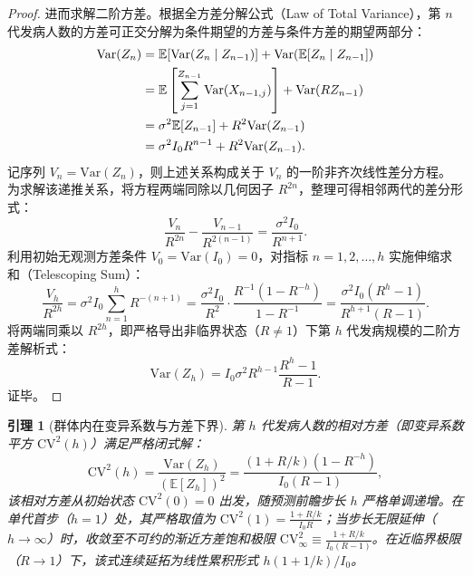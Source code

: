 \documentclass[11pt,a4paper]{article}
\theoremstyle{plain}
\newtheorem{lemma}{引理}
\theoremstyle{definition}
\begin{document}
\begin{proof}
进而求解二阶方差。根据全方差分解公式（Law of Total Variance），第 $n$ 代发病人数的方差可正交分解为条件期望的方差与条件方差的期望两部分：
\begin{align}
\text{Var}(Z_n) &= \mathbb{E}[\text{Var}(Z_n \mid Z_{n-1})] + \text{Var}(\mathbb{E}[Z_n \mid Z_{n-1}]) \notag \\
&= \mathbb{E}\left[\sum_{j=1}^{Z_{n-1}} \text{Var}(X_{n-1, j})\right] + \text{Var}(R Z_{n-1}) \notag \\
&= \sigma^2 \mathbb{E}[Z_{n-1}] + R^2 \text{Var}(Z_{n-1}) \notag \\
&= \sigma^2 I_0 R^{n-1} + R^2 \text{Var}(Z_{n-1}).
\end{align}
记序列 $V_n = \text{Var}(Z_n)$，则上述关系构成关于 $V_n$ 的一阶非齐次线性差分方程。为求解该递推关系，将方程两端同除以几何因子 $R^{2n}$，整理可得相邻两代的差分形式：
\begin{equation}
\frac{V_n}{R^{2n}} - \frac{V_{n-1}}{R^{2(n-1)}} = \frac{\sigma^2 I_0}{R^{n+1}}.
\end{equation}
利用初始无观测方差条件 $V_0 = \text{Var}(I_0) = 0$，对指标 $n = 1, 2, \dots, h$ 实施伸缩求和（Telescoping Sum）：
\begin{equation}
\frac{V_h}{R^{2h}} = \sigma^2 I_0 \sum_{n=1}^h R^{-(n+1)} = \frac{\sigma^2 I_0}{R^2} \cdot \frac{R^{-1}(1 - R^{-h})}{1 - R^{-1}} = \frac{\sigma^2 I_0 (R^h - 1)}{R^{h+1}(R - 1)}.
\end{equation}
将两端同乘以 $R^{2h}$，即严格导出非临界状态（$R \neq 1$）下第 $h$ 代发病规模的二阶方差解析式：
\begin{equation}
\text{Var}(Z_h) = I_0 \sigma^2 R^{h-1} \frac{R^h - 1}{R - 1}.
\end{equation}
证毕。
\end{proof}

\begin{lemma}[群体内在变异系数与方差下界]\label{lem:cv_floor}
第 $h$ 代发病人数的相对方差（即变异系数平方 $\text{CV}^2(h)$）满足严格闭式解：
\begin{equation}
\text{CV}^2(h) = \frac{\text{Var}(Z_h)}{(\mathbb{E}[Z_h])^2} = \frac{(1 + R/k)(1 - R^{-h})}{I_0(R - 1)},
\label{eq:cv_floor}
\end{equation}
该相对方差从初始状态 $\text{CV}^2(0)=0$ 出发，随预测前瞻步长 $h$ 严格单调递增。在单代首步（$h=1$）处，其严格取值为 $\text{CV}^2(1) = \frac{1+R/k}{I_0 R}$；当步长无限延伸（$h \to \infty$）时，收敛至不可约的渐近方差饱和极限 $\text{CV}^2_\infty \equiv \frac{1 + R/k}{I_0(R - 1)}$。在近临界极限（$R \to 1$）下，该式连续延拓为线性累积形式 $h(1+1/k)/I_0$。
\end{lemma}
\end{document}
